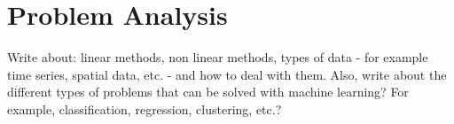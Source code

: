\chapter{Problem Analysis}\label{cha:problem-analysis}

Write about: linear methods, non linear methods, types of data - for example time series, spatial data, etc. - and how to deal with them. Also, write about the different types of problems that can be solved with machine learning? For example, classification, regression, clustering, etc.?


